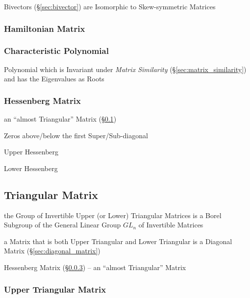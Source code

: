 Bivectors (\S\ref{sec:bivector}) are Isomorphic to Skew-symmetric Matrices



\subsubsection{Hamiltonian Matrix}\label{sec:hamiltonian_matrix}

\subsubsection{Characteristic Polynomial}\label{sec:characteristic_polynomial}

Polynomial which is Invariant under \emph{Matrix Similarity}
(\S\ref{sec:matrix_similarity}) and has the Eigenvalues as Roots



\subsubsection{Hessenberg Matrix}\label{sec:hessenberg_matrix}

an ``almost Triangular'' Matrix (\S\ref{sec:triangular_matrix})

Zeros above/below the first Super/Sub-diagonal

Upper Hessenberg

Lower Hessenberg



\subsection{Triangular Matrix}\label{sec:triangular_matrix}

the Group of Invertible Upper (or Lower) Triangular Matrices is a Borel
Subgroup of the General Linear Group $GL_n$ of Invertible Matrices

a Matrix that is both Upper Triangular and Lower Triangular is a Diagonal
Matrix (\S\ref{sec:diagonal_matrix})

\fist Hessenberg Matrix (\S\ref{sec:hessenberg_matrix}) -- an ``almost
Triangular'' Matrix



\subsubsection{Upper Triangular Matrix}\label{sec:upper_triangular}

